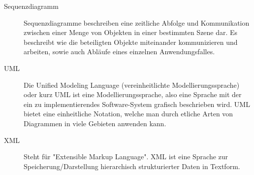 \begin{description}
\item[Sequenzdiagramm]
Sequenzdiagramme beschreiben eine zeitliche Abfolge und Kommunikation zwischen einer Menge von Objekten in einer bestimmten Szene dar. Es beschreibt wie die beteiligten Objekte miteinander kommunizieren und arbeiten, sowie auch Abläufe eines einzelnen Anwendungsfalles.

\item[UML]
Die Unified Modeling Language (vereinheitlichte Modellierungssprache) oder kurz UML ist eine Modellierungssprache, also eine Sprache mit der ein zu implementierendes Software-System grafisch beschrieben wird.
UML bietet eine einheitliche Notation, welche man durch etliche Arten von Diagrammen in viele Gebieten anwenden kann.

\item[XML]
Steht für "Extensible Markup Language". XML ist eine Sprache zur Speicherung/Darstellung hierarchisch strukturierter Daten in Textform.

\end{description}
